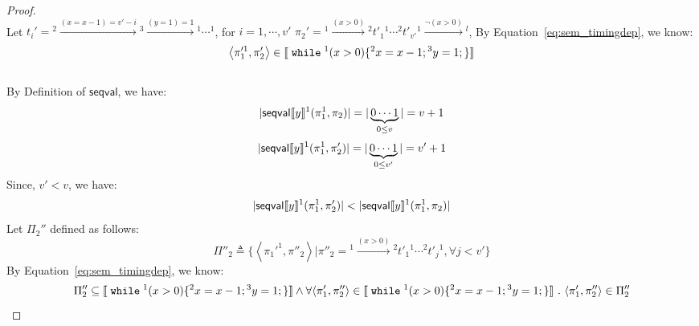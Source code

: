 \begin{example}
\begin{proof}
\[ \]
 Let 
 $t_i' = {}^2 \xrightarrow{(x = x - 1) = v' - i } {}^3 \xrightarrow{(y = 1) = 1} {}^1 \cdots  {}^1$, for $i = 1, \cdots, v'$
 $\pi_2' = {}^1 \xrightarrow{(x > 0)} {}^2 t'_1 {}^1 \cdots  {}^2 t'_{v'} {}^1 \xrightarrow{\neg(x > 0)} {}^l $,
  By Equation~\ref{eq:sem_timingdep}, we know:
 \[
 	\left< \pi_1'^1, \pi'_2 \right> \in \sem{\ewhile {}^1 (x > 0) \{{}^2 x = x - 1; {}^3 y = 1;\} }
 \]
 \\
 By Definition of $\mathsf{seqval}$, we have:
 \[
 	|\mathsf{seqval}\llbracket y \rrbracket{}^1(\pi_1^1, \pi_2 )| = |\underbrace{0 \cdots 1}_{0 \leq v}| = v + 1
 \]
 \[
 	|\mathsf{seqval}\llbracket y \rrbracket{}^1(\pi_1^1, \pi_2' )| = |\underbrace{0 \cdots 1}_{0 \leq v'}| = v' + 1
 \]
 Since, $v' < v $, we have: 
 \[
 	|\mathsf{seqval}\llbracket y \rrbracket{}^1(\pi_1^1, \pi_2' )| < |\mathsf{seqval}\llbracket y \rrbracket{}^1(\pi_1^1, \pi_2 )|
 \]
 Let $\Pi_2''$ defined as follows:
 \[
 	\Pi''_2 \triangleq \{
 	\left< \pi_1'^1, \pi''_2 \right> \vert
 	\pi''_2 =  {}^1 \xrightarrow{(x > 0)} {}^2 t'_1 {}^1 \cdots  {}^2 t'_{j} {}^1, \forall j < v'\} 
 \]
 By Equation~\ref{eq:sem_timingdep}, we know:
 \[
 		\Pi''_2 \subseteq \sem{\ewhile {}^1 (x > 0) \{{}^2 x = x - 1; {}^3 y = 1;\} }
 		\land
 		\forall \left< \pi_1', \pi''_2 \right> \in \sem{\ewhile {}^1 (x > 0) \{{}^2 x = x - 1; {}^3 y = 1;\} } 
 		\st \left< \pi_1', \pi''_2 \right> \in  \Pi''_2
 \]


\end{proof}
\end{example}
